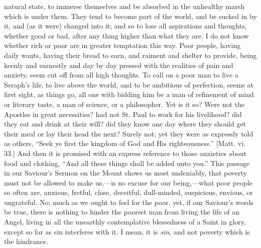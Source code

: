 natural state, to immerse themselves and be absorbed in the unhealthy
marsh which is under them. They tend to become part of the world, and
be sucked in by it, and (as it were) changed into it; and so to lose
all aspirations and thoughts, whether good or bad, after any thing
higher than what they are. I do not know whether rich or poor are in
greater temptation this way. Poor people, having daily wants, having
their bread to earn, and raiment and shelter to provide, being keenly
and earnestly and day by day pressed with the realities of pain and
anxiety, seem cut off from all high thoughts. To call on a poor man to
live a Seraph's life, to live above the world, and to be ambitious of
perfection, seems at first sight, as things go, all one with bidding
him be a man of refinement of mind or literary taste, a man of
science, or a philosopher. Yet is it so? Were not the Apostles in
great necessities? had not St. Paul to work for his livelihood? did
they eat and drink at their will? did they know one day where they
should get their meal or lay their head the next? Surely not; yet they
were as expressly told as others, ``Seek ye first the kingdom of
God and His righteousness.'' [Matt. vi. 33.] And then it is
promised with an express reference to those anxieties about food and
clothing, ``And all these things shall be added unto you.''
This passage in our Saviour's Sermon on the Mount shows us most
undeniably, that poverty must not be allowed to make us,—is no
excuse for our being,—what poor people so often are, anxious,
fretful, close, deceitful, dull-minded, suspicious, envious, or
ungrateful. No; much as we ought to feel for the poor, yet, if our
Saviour's words be true, there is nothing to hinder the poorest man
from living the life of an Angel, living in all the unearthly
contemplative blessedness of a Saint in glory, except so far as sin
interferes with it. I mean, it is \emph{sin}, and not poverty which is
the hindrance.


